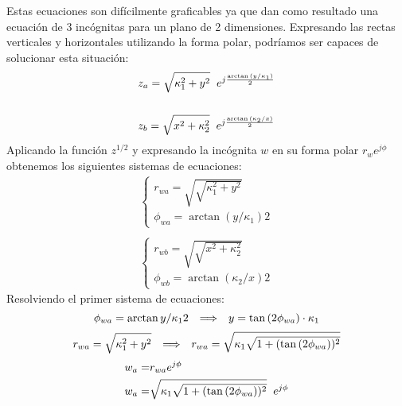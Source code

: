 Estas ecuaciones son difícilmente graficables ya que dan como resultado una ecuación de 3 incógnitas para un plano de 2 dimensiones.
Expresando las rectas verticales y horizontales utilizando la forma polar, podríamos ser capaces de solucionar esta situación:
\begin{equation}
    \begin{aligned}
        &z_a=\sqrt{\kappa_1^2+y^2}\hspace{0.2cm}e^{j\frac{\arctan{(y/\kappa_1)}}{2}}\\
        &\\
        &z_b=\sqrt{x^2+\kappa_2^2}\hspace{0.2cm}e^{j\frac{\arctan{(\kappa_2/x)}}{2}}
    \end{aligned}
\end{equation}
Aplicando la función $z^{1/2}$ y expresando la incógnita $w$ en su forma polar $r_we^{j\phi}$ obtenemos los siguientes sistemas de ecuaciones:
\begin{equation}
\begin{aligned}
    &\begin{cases}
        r_{wa}=\sqrt{\sqrt{\kappa_1^2+y^2}}\\
        \phi_{wa}=\arctan{(y/\kappa_1)}{2}
    \end{cases}
    &\\
    &\\
    &\begin{cases}
        r_{wb}=\sqrt{\sqrt{x^2+\kappa_2^2}}\\
        \phi_{wb}=\arctan{(\kappa_2/x)}{2}
    \end{cases}
\end{aligned}
\end{equation}
Resolviendo el primer sistema de ecuaciones:
\begin{equation}
    \phi_{wa}=\arctan{y/\kappa_1}{2}\hspace{0.25cm} \Longrightarrow \hspace{0.25cm} y=\tan{(2\phi_{wa})}\cdot\kappa_1
\end{equation}
\begin{equation}
    r_{wa}=\sqrt{\kappa_1^2+y^2}\hspace{0.25cm} \Longrightarrow \hspace{0.25cm} r_{wa}=\sqrt{\kappa_1\sqrt{1+(\tan{(2\phi_{wa})})^2}}
\end{equation}
\begin{equation}
    \begin{aligned}
        w_a=&r_{wa}e^{j\phi}\\
        w_a=&\sqrt{\kappa_1\sqrt{1+(\tan{(2\phi_{wa})})^2}}\hspace{0.2cm}e^{j\phi}
    \end{aligned}
\end{equation}
